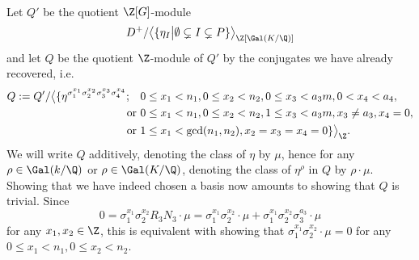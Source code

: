 \paragraph*{}
Let $Q'$ be the quotient $\Z[G]$-module $$D^+/\big\langle \{\eta_I \big\vert \emptyset \subsetneq I \subsetneq P \}\big\rangle_{\Z[\Gal(K/\Q)]}$$
and let $Q$ be the quotient $\Z$-module of $Q'$ by the conjugates we have already recovered, i.e.
\begin{align*}
Q:=Q'/\big\langle \{\eta^{\sigma_1^{x_1}\sigma_2^{x_2}\sigma_3^{x_3}\sigma_4^{x_4}}; \quad & 0\leq x_1< n_1, 0\leq x_2<n_2, 0\leq x_3<a_3m,0< x_4<a_4,\\
\text { or }& 0\leq x_1< n_1, 0\leq x_2<n_2, 1\leq x_3<a_3m, x_3\neq a_3, x_4=0,\\
\text { or }& 1\leq x_1<\gcd(n_1,n_2), x_2=x_3=x_4=0 \}\big\rangle_{\Z}.
\end{align*}
We will write $Q$ additively, denoting the class of $\eta$ by $\mu$, hence for any $\rho\in\Gal(k/\Q)$ or $\rho\in\Gal(K/\Q)$, denoting the class of $\eta^{\rho}$ in $Q$ by $\rho\cdot \mu$.
Showing that we have indeed chosen a basis now amounts to showing that $Q$ is trivial. Since $$0=\sigma_1^{x_1}\sigma_2^{x_2}R_3N_3\cdot \mu=\sigma_1^{x_1}\sigma_2^{x_2}\cdot \mu+\sigma_1^{x_1}\sigma_2^{x_2}\sigma_3^{a_3}\cdot \mu$$
for any $x_1,x_2\in\Z$,
this is equivalent with showing that $\sigma_1^{x_1}\sigma_2^{x_2}\cdot \mu=0$ for any $0\leq x_1<n_1, 0\leq x_2<n_2$.

